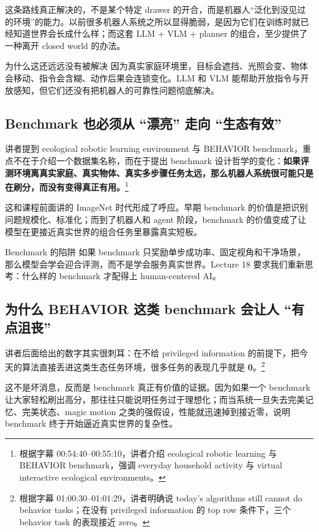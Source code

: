 这条路线真正解决的，不是某个特定 drawer 的开合，而是机器人``泛化到没见过的环境''的能力。以前很多机器人系统之所以显得脆弱，是因为它们在训练时就已经知道世界会长成什么样；而这套 LLM + VLM + planner 的组合，至少提供了一种离开 closed world 的办法。

\begin{warningbox}{为什么这还远远没有被解决}
因为真实家庭环境里，目标会遮挡、光照会变、物体会移动、指令会含糊、动作后果会连锁变化。LLM 和 VLM 能帮助开放指令与开放感知，但它们还没有把机器人的可靠性问题彻底解决。
\end{warningbox}

\subsection{Benchmark 也必须从 ``漂亮'' 走向 ``生态有效''}

讲者提到 ecological robotic learning environment 与 BEHAVIOR benchmark，重点不在于介绍一个数据集名称，而在于提出 benchmark 设计哲学的变化：\textbf{如果评测环境离真实家庭、真实物体、真实多步骤任务太远，那么机器人系统很可能只是在刷分，而没有变得真正有用。}\footnote{根据字幕 00:54:40--00:55:10，讲者介绍 ecological robotic learning 与 BEHAVIOR benchmark，强调 everyday household activity 与 virtual interactive ecological environments。}

这和课程前面讲的 ImageNet 时代形成了呼应。早期 benchmark 的价值是把识别问题规模化、标准化；而到了机器人和 agent 阶段，benchmark 的价值变成了让模型在更接近真实世界的组合任务里暴露真实短板。

\begin{warningbox}{Benchmark 的陷阱}
如果 benchmark 只奖励单步成功率、固定视角和干净场景，那么模型会学会迎合评测，而不是学会服务真实世界。Lecture 18 要求我们重新思考：什么样的 benchmark 才配得上 human-centered AI。
\end{warningbox}

\subsection{为什么 BEHAVIOR 这类 benchmark 会让人 ``有点沮丧''}

讲者后面给出的数字其实很刺耳：在不给 privileged information 的前提下，把今天的算法直接丢进这类生态任务环境，很多任务的表现几乎就是 \textbf{0}。\footnote{根据字幕 01:00:30--01:01:29，讲者明确说 today's algorithms still cannot do behavior tasks；在没有 privileged information 的 top row 条件下，三个 behavior task 的表现接近 zero。}

这不是坏消息，反而是 benchmark 真正有价值的证据。因为如果一个 benchmark 让大家轻松刷出高分，那往往只能说明任务过于理想化；而当系统一旦失去完美记忆、完美状态、magic motion 之类的强假设，性能就迅速掉到接近零，说明 benchmark 终于开始逼近真实世界的复杂性。

